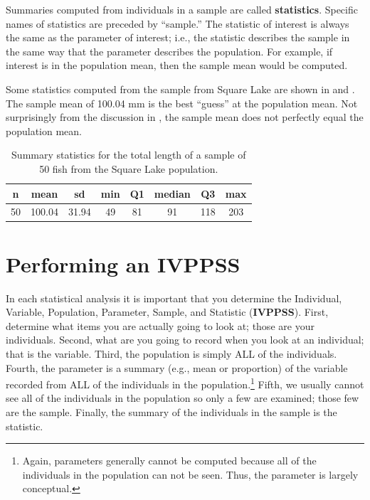 \documentclass[10pt,openany]{book}\usepackage[]{graphicx}\usepackage[]{color}
\begin{document}

Summaries computed from individuals in a sample are called \textbf{statistics}.  Specific names of statistics are preceded by ``sample.''  The statistic of interest is always the same as the parameter of interest; i.e., the statistic describes the sample in the same way that the parameter describes the population.  For example, if interest is in the population mean, then the sample mean would be computed.

Some statistics computed from the sample from Square Lake are shown in  and .  The sample mean of 100.04 mm is the best ``guess'' at the population mean.  Not surprisingly from the discussion in , the sample mean does not perfectly equal the population mean.

\begin{table}[ht]
\centering
\caption{Summary statistics for the total length of a sample of 50 fish from the Square Lake population.} 
\label{tab:SquareLakeSample1}
\begin{tabular}{cccccccc}
 n & mean & sd & min & Q1 & median & Q3 & max \\ 
  \hline
50 & 100.04 & 31.94 & 49 & 81 & 91 & 118 & 203 \\ 
   \hline
\end{tabular}
\end{table}




\section{Performing an IVPPSS}
\vspace{-12pt}
In each statistical analysis it is important that you determine the Individual, Variable, Population, Parameter, Sample, and Statistic (\textbf{IVPPSS}). First, determine what items you are actually going to look at; those are your individuals.  Second, what are you going to record when you look at an individual; that is the variable.  Third, the population is simply ALL of the individuals.  Fourth, the parameter is a summary (e.g., mean or proportion) of the variable recorded from ALL of the individuals in the population.\footnote{Again, parameters generally cannot be computed because all of the individuals in the population can not be seen.  Thus, the parameter is largely conceptual.}  Fifth, we usually cannot see all of the individuals in the population so only a few are examined; those few are the sample.  Finally, the summary of the individuals in the sample is the statistic.
\end{document}

